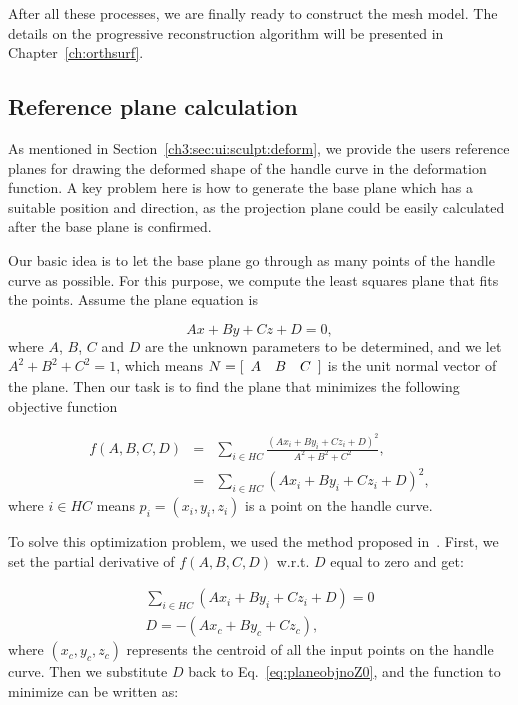 After all these processes, we are finally ready to construct  the
mesh model. The details on the progressive reconstruction algorithm
will be presented in Chapter~\ref{ch:orthsurf}.


\subsection{Reference plane calculation}
\label{ch3:sec:algo:refplane}

As mentioned in Section~\ref{ch3:sec:ui:sculpt:deform}, we provide
the users reference planes for drawing the deformed shape of the
handle curve in the deformation function. A key problem here is how
to generate the base plane which has a suitable position and
direction, as the projection plane could be easily calculated after
the base plane is confirmed.

Our basic idea is to let the base plane go through as many points of
the handle curve as possible. For this purpose, we compute the least
squares plane that fits the points. Assume the plane equation is

\begin{equation}
\label{eq:planefunc}
    Ax+By+Cz+D=0,
\end{equation}
where $A$, $B$, $C$ and $D$ are the unknown parameters to be determined,
and we let $A^2+B^2+C^2=1$, which means
$N = [\begin{array}{*{20}c} A & B & C \end{array}]$ is the unit normal
vector of the plane. Then our task is to find the plane that minimizes
the following objective function

\begin{eqnarray}
\label{eq:planeobjnoZ0}
    f(A,B,C,D) &=& \sum\limits_{i \in HC}
    {\frac {(Ax_i+By_i+Cz_i+D)^2}{A^2+B^2+C^2}},\nonumber\\
    &=& \sum\limits_{i \in HC} {(Ax_i+By_i+Cz_i+D)^2},
\end{eqnarray}
where $i \in HC$  means $p_i=(x_i,y_i,z_i)$ is a point on the handle curve.

To solve this optimization problem, we used the method proposed
in~\cite{SWMB59}. First, we set the partial derivative of
$f(A,B,C,D)$ w.r.t. $D$ equal to zero and get:

\begin{eqnarray}
\label{eq:planeobjPartD}
    \sum\limits_{i \in HC} {(Ax_i+By_i+Cz_i+D)} = 0\nonumber\\
    D = -(Ax_c + By_c + Cz_c),
\end{eqnarray}
where $(x_c, y_c, z_c)$ represents the centroid of all the
input points on the handle curve. Then we substitute $D$ back
to Eq.~\ref{eq:planeobjnoZ0}, and the function to minimize can
be written as:

